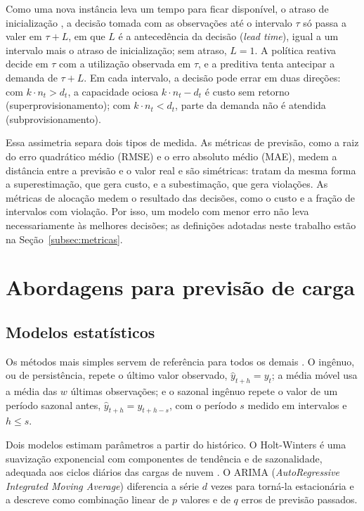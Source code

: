 Como uma nova instância leva um tempo para ficar disponível, o atraso de inicialização \cite{mao2012startup}, a decisão tomada com as observações até o intervalo $\tau$ só passa a valer em $\tau + L$, em que $L$ é a antecedência da decisão (\textit{lead time}), igual a um intervalo mais o atraso de inicialização; sem atraso, $L = 1$. A política reativa decide em $\tau$ com a utilização observada em $\tau$, e a preditiva tenta antecipar a demanda de $\tau + L$. Em cada intervalo, a decisão pode errar em duas direções: com $k \cdot n_t > d_t$, a capacidade ociosa $k \cdot n_t - d_t$ é custo sem retorno (superprovisionamento); com $k \cdot n_t < d_t$, parte da demanda não é atendida (subprovisionamento).

Essa assimetria separa dois tipos de medida. As métricas de previsão, como a raiz do erro quadrático médio (RMSE) e o erro absoluto médio (MAE), medem a distância entre a previsão e o valor real e são simétricas: tratam da mesma forma a superestimação, que gera custo, e a subestimação, que gera violações. As métricas de alocação medem o resultado das decisões, como o custo e a fração de intervalos com violação. Por isso, um modelo com menor erro não leva necessariamente às melhores decisões; as definições adotadas neste trabalho estão na Seção~\ref{subsec:metricas}.

\section{Abordagens para previsão de carga}
\label{sec:previsao}

\subsection{Modelos estatísticos}
\label{subsec:estatisticos}

Os métodos mais simples servem de referência para todos os demais \cite{hyndman2018forecasting}. O ingênuo, ou de persistência, repete o último valor observado, $\hat{y}_{t+h} = y_t$; a média móvel usa a média das $w$ últimas observações; e o sazonal ingênuo repete o valor de um período sazonal antes, $\hat{y}_{t+h} = y_{t+h-s}$, com o período $s$ medido em intervalos e $h \leq s$.

Dois modelos estimam parâmetros a partir do histórico. O Holt-Winters é uma suavização exponencial com componentes de tendência e de sazonalidade, adequada aos ciclos diários das cargas de nuvem \cite{hyndman2018forecasting}. O ARIMA (\textit{AutoRegressive Integrated Moving Average}) \cite{box2015time} diferencia a série $d$ vezes para torná-la estacionária e a descreve como combinação linear de $p$ valores e de $q$ erros de previsão passados.

